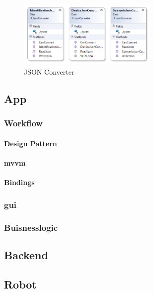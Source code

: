 \begin{figure}[h]
	\begin{center}
		\includegraphics[width=0.6\textwidth]{images/uml/json_converter.png}
	\end{center}
	\caption{JSON Converter}
	\label{fig:converter_classdiagram}
\end{figure}

\newpage
\subsection{App}

\subsubsection{Workflow} %

\paragraph{Design Pattern}
\paragraph{\acrfull{mvvm}}
\paragraph{Bindings}

\subsubsection{\acrfull{gui}} %

\subsubsection{Buisnesslogic} %

\subsection{Backend}

\subsection{Robot}

